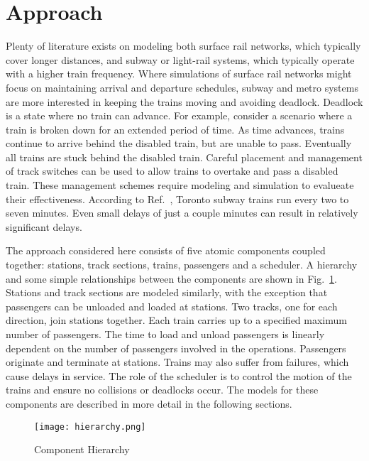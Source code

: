 \section{Approach}
Plenty of literature exists on modeling both surface rail networks, which typically cover longer distances, and subway or light-rail systems, which typically operate with a higher train frequency. Where simulations of surface rail networks might focus on maintaining arrival and departure schedules, subway and metro systems are more interested in keeping the trains moving and avoiding deadlock.  Deadlock is a state where no train can advance.  For example, consider a scenario where a train is broken down for an extended period of time.  As time advances, trains continue to arrive behind the disabled train, but are unable to pass.  Eventually all trains are stuck behind the disabled train.  Careful placement and management of track switches can be used to allow trains to overtake and pass a disabled train. These management schemes require modeling and simulation to evalueate their effectiveness.  According to Ref.~, Toronto subway trains run every two to seven minutes. Even small delays of just a couple minutes can result in relatively significant delays.

The approach considered here consists of five atomic components coupled together: stations, track sections, trains, passengers and a scheduler. A hierarchy and some simple relationships between the components are shown in Fig.~\ref{fig:hierarchy}.  Stations and track sections are modeled similarly, with the exception that passengers can be unloaded and loaded at stations. Two tracks, one for each direction, join stations together. Each train carries up to a specified maximum number of passengers. The time to load and unload passengers is linearly dependent on the number of passengers involved in the operations. Passengers originate and terminate at stations.  Trains may also suffer from failures, which cause delays in service.  The role of the scheduler is to control the motion of the trains and ensure no collisions or deadlocks occur.  The models for these components are described in more detail in the following sections.
%
\begin{figure}[htb]
	\centering
	\texttt{[image: hierarchy.png]}
	\caption{Component Hierarchy}
	\label{fig:hierarchy}
\end{figure}
%
